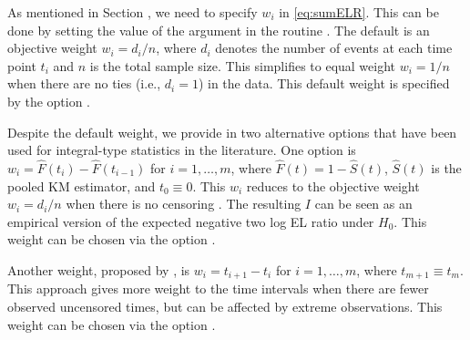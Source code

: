 As mentioned in Section , we need to specify $w_i$ in \eqref{eq:sumELR}. This can be done by setting the value of the argument  in the routine . The default is an objective weight $w_i=d_i/n$, where $d_i$ denotes the number of events at each time point $t_i$ and $n$ is the total sample size. %
This simplifies to equal weight $w_i=1/n$ when there are no ties (i.e., $d_i=1$) in the data. %
This default weight is specified by the option .

Despite the default weight, we provide in  two alternative options that have been used for integral-type statistics in the literature. %
One option is
$w_i=\hat{F}(t_i)-\hat{F}(t_{i-1})$ for $i=1,\ldots,m$, where $\hat{F}(t)=1-\hat{S}(t)$, $\hat{S}(t)$ is the pooled KM estimator, and $t_0 \equiv 0$. This $w_i$ reduces to the objective weight $w_i=d_i/n$ when there is no censoring \citep[see, e.g.,][]{EM:2013}. The resulting $I$ can be seen as an empirical version of
the expected negative two log EL ratio under $H_0$.
This weight can be chosen via the option .

Another weight, proposed by \citet{PF:1989}, is $w_i=t_{i+1}-t_i$ for $i=1,\ldots,m$, where $t_{m+1} \equiv t_{m}$.
This approach gives more weight to the time intervals when there are fewer observed uncensored times, %
but can be affected by extreme observations. This weight can be chosen via the option .


